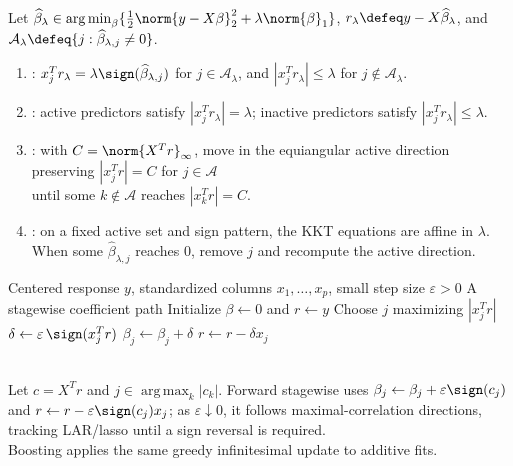 \begin{method} \label{meth:sl-lar-lasso-modification} \\
Let $\widehat{\beta}_\lambda\in\operatorname*{arg\,min}_{\beta}\{\frac12\norm{y-X\beta}_2^2+\lambda\norm{\beta}_1\}$, $r_\lambda\defeq y-X\widehat{\beta}_\lambda$, and $\mathcal{A}_\lambda\defeq\{j:\widehat{\beta}_{\lambda,j}\neq0\}$.
\begin{enumerate}[label=(\roman*)]
\setlength{\itemsep}{0pt}
\item {}: $x_j^Tr_\lambda=\lambda\sign(\widehat{\beta}_{\lambda,j})$ for $j\in\mathcal{A}_\lambda$, and $|x_j^Tr_\lambda|\leq\lambda$ for $j\notin\mathcal{A}_\lambda$.
\item {}: active predictors satisfy $|x_j^Tr_\lambda|=\lambda$; inactive predictors satisfy $|x_j^Tr_\lambda|\leq\lambda$.
\item {}: with $C=\norm{X^Tr}_\infty$, move in the equiangular active direction preserving $|x_j^Tr|=C$ for $j\in\mathcal{A}$\\
until some $k\notin\mathcal{A}$ reaches $|x_k^Tr|=C$.
\item {}: on a fixed active set and sign pattern, the KKT equations are affine in $\lambda$.\\
When some $\widehat{\beta}_{\lambda,j}$ reaches $0$, remove $j$ and recompute the active direction.
\end{enumerate}
\end{method}

\begin{breakablealgorithm}
\caption{Incremental Forward Stagewise Regression}
\label{alg:sl-incremental-forward-stagewise-regression}
\begin{algorithmic}
\Require Centered response $y$, standardized columns $x_1,\ldots,x_p$, small step size $\varepsilon>0$
\Ensure A stagewise coefficient path
\State Initialize $\beta\gets0$ and $r\gets y$
\Repeat
\State Choose $j$ maximizing $|x_j^Tr|$
\State $\delta\gets\varepsilon\,\sign(x_j^Tr)$
\State $\beta_j\gets\beta_j+\delta$
\State $r\gets r-\delta x_j$
\end{algorithmic}
\end{breakablealgorithm}

\begin{remark} \label{rem:sl-lar-stagewise-comparison} \\
Let $c=X^Tr$ and $j\in\operatorname*{arg\,max}_k |c_k|$. Forward stagewise uses $\beta_j\gets\beta_j+\varepsilon\sign(c_j)$ and $r\gets r-\varepsilon\sign(c_j)x_j$; as $\varepsilon\downarrow0$, it follows maximal-correlation directions, tracking LAR/lasso until a sign reversal is required.\\
Boosting applies the same greedy infinitesimal update to additive fits.
\end{remark}

